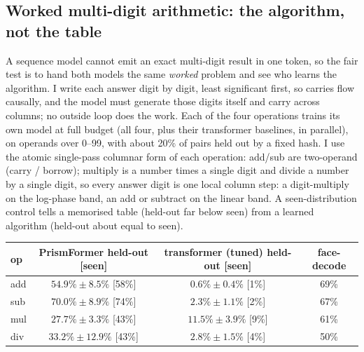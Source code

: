 \documentclass[11pt]{article}
\begin{document}
\subsection{Worked multi-digit arithmetic: the algorithm, not the table}\label{sec:worked}

A sequence model cannot emit an exact multi-digit result in one token, so the fair test is to hand both
models the same \emph{worked} problem and see who learns the algorithm. I write each answer digit by
digit, least significant first, so carries flow causally, and the model must generate those digits
itself and carry across columns; no outside loop does the work. Each of the four operations trains its
own model at full budget (all four, plus their transformer baselines, in parallel), on operands over
0--99, with about 20\% of pairs held out by a fixed hash. I use the atomic single-pass columnar form of
each operation: add/sub are two-operand (carry / borrow); multiply is a number times a single digit and
divide a number by a single digit, so every answer digit is one local column step: a digit-multiply on
the log-phase band, an add or subtract on the linear band. A seen-distribution control tells a memorised
table (held-out far below seen) from a learned algorithm (held-out about equal to seen).

\begin{center}
\begin{tabular}{@{}lccc@{}}
\toprule
op & PrismFormer held-out [seen] & transformer (tuned) held-out [seen] & face-decode \\
\midrule
add & $\mathbf{54.9\% \pm 8.5\%}$ [58\%] & $0.6\% \pm 0.4\%$ [1\%] & 69\% \\
sub & $\mathbf{70.0\% \pm 8.9\%}$ [74\%] & $2.3\% \pm 1.1\%$ [2\%] & 67\% \\
mul & $\mathbf{27.7\% \pm 3.3\%}$ [43\%] & $11.5\% \pm 3.9\%$ [9\%] & 61\% \\
div & $\mathbf{33.2\% \pm 12.9\%}$ [43\%] & $2.8\% \pm 1.5\%$ [4\%] & 50\% \\
\bottomrule
\end{tabular}
\end{center}
\end{document}
